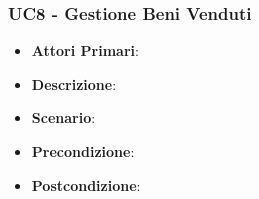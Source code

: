 \subsubsection{UC8 - Gestione Beni Venduti}
\begin{itemize}
	\item \textbf{Attori Primari}:
	\item \textbf{Descrizione}:
	\item \textbf{Scenario}:
	\item \textbf{Precondizione}:
	\item \textbf{Postcondizione}:
\end{itemize}

